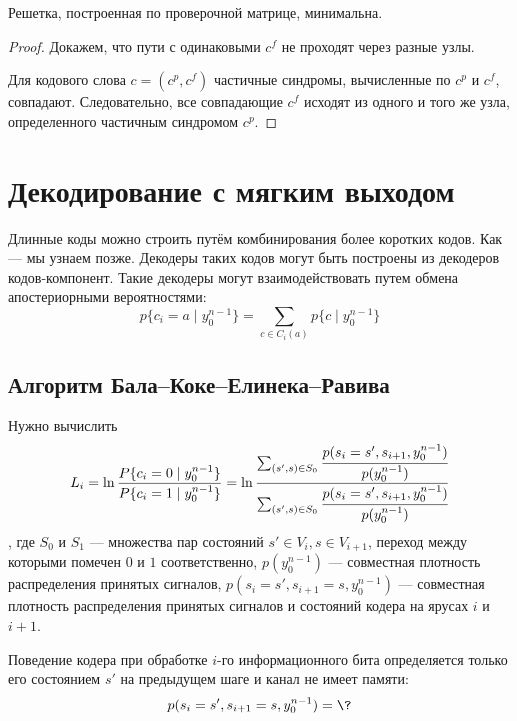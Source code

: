 \unfinished

\begin{theorem}
    Решетка, построенная по проверочной матрице, минимальна.
\end{theorem}
\begin{proof}
    Докажем, что пути с одинаковыми \(c^f\) не проходят через разные узлы.

    Для кодового слова \(c = (c^p, c^f)\) частичные синдромы,
    вычисленные по \(c^p\) и \(c^f\), совпадают.
    Следовательно, все совпадающие \(c^f\) исходят из одного и того же узла, определенного частичным синдромом \(c^p\).
\end{proof}

\section{Декодирование с мягким выходом}

Длинные коды можно строить путём комбинирования более коротких кодов. Как --- мы узнаем позже.
Декодеры таких кодов могут быть построены из декодеров кодов-компонент.
Такие декодеры могут взаимодействовать путем обмена апостериорными вероятностями:
\[p \{c_i = a \mid y_0^{n -1}\} = \sum_{c \in C_i(a)} p \{c \mid y_0^{n -1}\}\]
\?

\subsection{Алгоритм Бала--Коке--Елинека--Равива}

Нужно вычислить
\[L_i = \ln \frac{P \{c_i = 0 \mid y_0^{n -1}\}}{P \{c_i = 1 \mid y_0^{n -1}\}}
 = \ln \frac{\sum_{(s', s) \in S_0} \cfrac{p(s_i = s', s_{i+1}, y_0^{n - 1})}{p(y_0^{n -1})}}{\sum_{(s', s) \in S_0} \cfrac{p(s_i = s', s_{i+1}, y_0^{n - 1})}{p(y_0^{n -1})}}\]
, где \(S_0\) и \(S_1\) --- множества пар состояний \(s' \in V_i, s \in V_{i+1}\),
переход между которыми помечен \(0\) и \(1\) соответственно,
\(p(y_0^{n -1})\) --- совместная плотность распределения принятых сигналов,
\(p(s_i = s', s_{i+1} = s, y_0^{n - 1})\) --- совместная плотность распределения принятых сигналов и состояний кодера на ярусах \(i\) и \(i + 1\).

Поведение кодера при обработке \(i\)-го информационного бита определяется
только его состоянием \(s'\) на предыдущем шаге и канал не имеет памяти:
\begin{align}
    p(s_i = s', s_{i+1} =s, y_0^{n - 1})
    & = \? \\
\end{align}